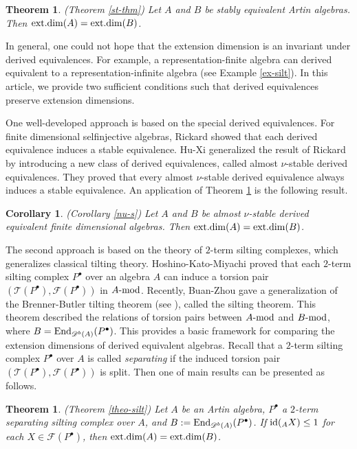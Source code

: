\documentclass[12pt]{article}
\numberwithin{equation}{section}
\newtheorem{Theo}[Def]{Theorem}
\newtheorem{Koro}[Def]{Corollary}
\theoremstyle{definition}
\newcommand{\End}{{\rm End}}
\def\ed{\mathop{\rm ext.dim}\nolimits}
\newcommand{\id}{{\rm id}}
\newcommand{\F}{{\mathcal F}}
\newcommand{\T}{{\mathcal T}}
\newcommand{\cpx}[1]{#1^{\bullet}}
\newcommand{\Db}[1]{{\mathscr D}^b(#1)}
\newcommand{\modcat}{\ensuremath{\mbox{{\rm -mod}}}}
\begin{document}
\begin{Theo}\label{main-st}{\rm (Theorem \ref{st-thm})}
Let $A$ and $B$ be stably equivalent Artin algebras. Then $\ed(A)=\ed(B)$.
\end{Theo}

In general, one could not hope that the extension dimension is an invariant under derived equivalences. For example, a representation-finite algebra can derived equivalent to a representation-infinite algebra (see Example \ref{ex-silt}). In this article, we provide two sufficient conditions such that derived equivalences preserve extension dimensions.

One well-developed approach is based on the special derived equivalences.
For finite dimensional selfinjective algebras, Rickard \cite{r89} showed that each derived equivalence induces a stable equivalence.
Hu-Xi \cite{hx10} generalized the result of Rickard by introducing a new class of derived equivalences, called almost $\nu$-stable derived equivalences. They proved that every almost $\nu$-stable derived equivalence always induces a stable equivalence. An application of Theorem \ref{main-st} is the following result.

\begin{Koro}\label{main-nu}{\rm (Corollary \ref{nu-s})}
Let $A$ and $B$ be almost $\nu$-stable derived equivalent finite dimensional algebras. Then $\ed(A)=\ed(B)$.
\end{Koro}
The second approach is based on the theory of $2$-term silting complexes, which generalizes classical tilting theory. Hoshino-Kato-Miyachi \cite{HKM02} proved that each $2$-term silting complex $\cpx{P}$ over an algebra $A$ can induce a torsion pair $(\T(\cpx{P}),\F(\cpx{P}))$ in $A\modcat$.
Recently, Buan-Zhou \cite{Buan2016} gave a generalization of the Brenner-Butler tilting theorem (see \cite{bb79,hr82}), called the silting theorem.
This theorem described the relations of torsion pairs between $A\modcat$ and $B\modcat$, where $B=\End_{\Db{A}}(\cpx{P})$.
This provides a basic framework for comparing the extension dimensions of derived equivalent algebras.
Recall that a $2$-term silting complex $P^{\bullet}$ over $A$ is called \emph{separating} if the induced torsion pair $(\T(\cpx{P}),\F(\cpx{P}))$ is split.
Then one of main results can be presented as follows.

\begin{Theo}\label{main-silt}{\rm (Theorem \ref{theo-silt})}
Let $A$ be an Artin algebra, $P^{\bullet}$ a $2$-term separating silting complex over $A$, and $B:=\End_{\Db{A}}(P^{\bullet})$. If $\id(_AX)\le 1$ for each $X\in \F(P^{\bullet})$, then $\ed(A)=\ed(B)$.
\end{Theo}
\end{document}

